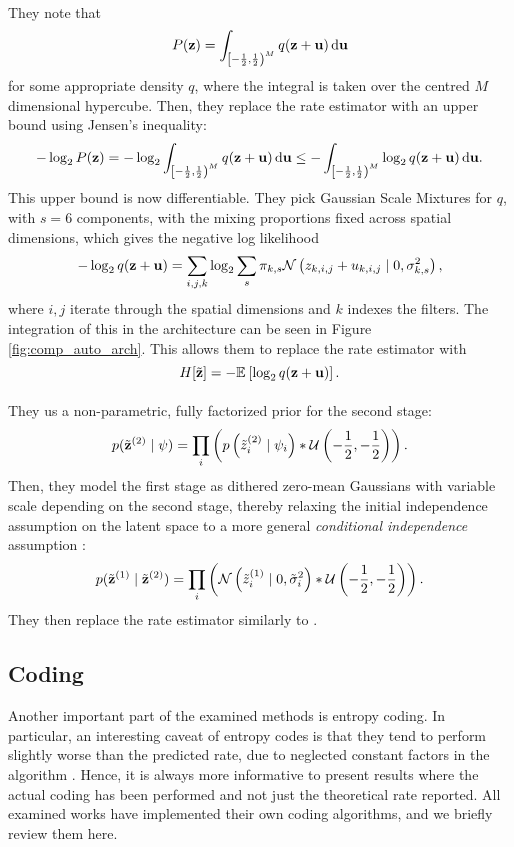 \paragraph{\cite{theis2017lossy}} They note that
  \[
    P(\mathbf{z}) = \int_{\left[-\frac{1}{2}, \frac{1}{2}\right)^M} q(\mathbf{z} + \mathbf{u}) \,\text{d} \mathbf{u}
  \]
  for some appropriate density $q$,
  where the integral is taken over the centred $M$ dimensional hypercube.
  Then, they replace the rate estimator with an upper bound using Jensen's
  inequality:
  \[
    -\log_2P(\mathbf{z}) = -\log_2\int_{\left[-\frac{1}{2}, \frac{1}{2}\right)^M} q(\mathbf{z} +
    \mathbf{u}) \,\text{d} \mathbf{u} \leq -\int_{\left[-\frac{1}{2}, \frac{1}{2}\right)^M} \log_2q(\mathbf{z} +
    \mathbf{u}) \,\text{d} \mathbf{u}.
  \]
  This upper bound is now differentiable. They pick Gaussian Scale Mixtures for
  $q$, with $s = 6$ components, with the mixing proportions fixed across spatial
  dimensions, which gives the negative log likelihood
  \[
    -\log_2 q(\mathbf{z} + \mathbf{u}) =
    \sum_{i, j, k} \log_2 \sum_s \pi_{k, s} \mathcal{N}\left( z_{k,i,j} + u_{k, i, j} \mid
    0, \sigma_{k, s}^2 \right),
  \]
  where $i,j$ iterate through the spatial dimensions and $k$ indexes the
  filters. The integration of this in the architecture can be seen in Figure
  \ref{fig:comp_auto_arch}.  This allows them to replace the rate estimator with
  \[
    H[\tilde{\mathbf{z}}] = -\mathbb{E}_{}\left[ \log_2 q(\mathbf{z} + \mathbf{u}) \right].
  \]

  \paragraph{\cite{balle2018variational}} They us a non-parametric,
  fully factorized prior for the second stage:
  \[
    p(\tilde{\mathbf{z}}^{(2)} \mid \psi) =
    \prod_i \left(  p\left(\tilde{z}^{(2)}_i \mid \psi_i\right) *
      \mathcal{U}\left( -\frac{1}{2}, -\frac{1}{2}\right) \right).
  \]
  Then, they model the first stage as dithered zero-mean Gaussians with variable
  scale depending on the second stage, thereby relaxing the initial independence
  assumption on the latent space to a more general \textit{conditional
    independence} assumption \cite{bishop1998latent}:
  \[
    p(\tilde{\mathbf{z}}^{(1)} \mid \tilde{\mathbf{z}}^{(2)}) = 
    \prod_i \left(  \mathcal{N}\left( \tilde{z}^{(1)}_i \mid 0, \tilde{\sigma}^2_i\right)*
      \mathcal{U}\left( -\frac{1}{2}, -\frac{1}{2} \right) \right).
  \]
  They then replace the rate estimator similarly to \cite{balle2016end}.

\subsection{Coding}
\par
Another important part of the examined methods is entropy coding. In particular, an
interesting caveat of entropy codes is that they tend to perform slightly worse
than the predicted rate, due to neglected constant factors in the algorithm
\cite{rissanen1981universal}. Hence, it is always more informative to present
results where the actual coding has been performed and not just the theoretical
rate reported. All examined works have implemented their own coding algorithms,
and we briefly review them here. 

